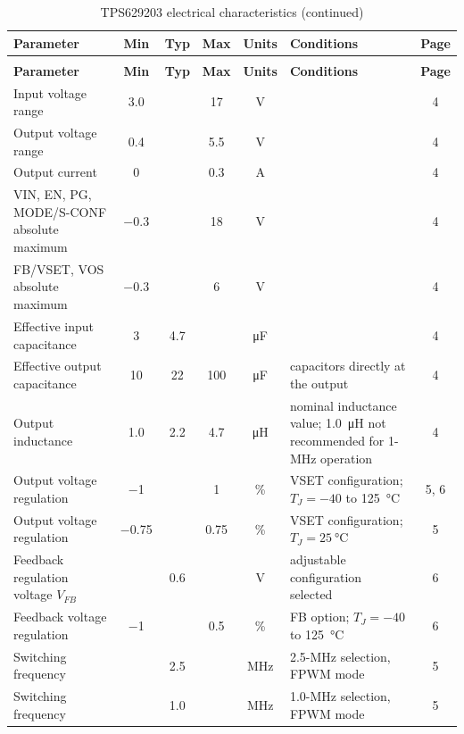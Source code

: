 {\footnotesize
\begin{longtable}{|L{4.4cm}|c|c|c|c|L{3.6cm}|c|}
\caption{TPS629203 electrical characteristics}\label{tab:tps629203}\\
\hline
\textbf{Parameter} & \textbf{Min} & \textbf{Typ} & \textbf{Max} & \textbf{Units} & \textbf{Conditions} & \textbf{Page} \\
\hline
\endfirsthead
\caption[]{TPS629203 electrical characteristics (continued)}\\
\hline
\textbf{Parameter} & \textbf{Min} & \textbf{Typ} & \textbf{Max} & \textbf{Units} & \textbf{Conditions} & \textbf{Page} \\
\hline
\endhead
Input voltage range & \num{3.0} & & \num{17} & \si{\volt} & & 4 \\
\hline
Output voltage range & \num{0.4} & & \num{5.5} & \si{\volt} & & 4 \\
\hline
Output current & \num{0} & & \num{0.3} & \si{\ampere} & & 4 \\
\hline
VIN, EN, PG, MODE/S-CONF absolute maximum & \num{-0.3} & & \num{18} & \si{\volt} & & 4 \\
\hline
FB/VSET, VOS absolute maximum & \num{-0.3} & & \num{6} & \si{\volt} & & 4 \\
\hline
Effective input capacitance & \num{3} & \num{4.7} & & \si{\micro\farad} & & 4 \\
\hline
Effective output capacitance & \num{10} & \num{22} & \num{100} & \si{\micro\farad} & capacitors directly at the output & 4 \\
\hline
Output inductance & \num{1.0} & \num{2.2} & \num{4.7} & \si{\micro\henry} & nominal inductance value; \SI{1.0}{\micro\henry} not recommended for 1-MHz operation & 4 \\
\hline
Output voltage regulation & \num{-1} & & \num{1} & \% & VSET configuration; \(T_J=-40\) to \SI{125}{\celsius} & 5, 6 \\
\hline
Output voltage regulation & \num{-0.75} & & \num{0.75} & \% & VSET configuration; \(T_J=\SI{25}{\celsius}\) & 5 \\
\hline
Feedback regulation voltage \(V_{FB}\) & & \num{0.6} & & \si{\volt} & adjustable configuration selected & 6 \\
\hline
Feedback voltage regulation & \num{-1} & & \num{0.5} & \% & FB option; \(T_J=-40\) to \SI{125}{\celsius} & 6 \\
\hline
Switching frequency & & \num{2.5} & & \si{\mega\hertz} & 2.5-MHz selection, FPWM mode & 5 \\
\hline
Switching frequency & & \num{1.0} & & \si{\mega\hertz} & 1.0-MHz selection, FPWM mode & 5 \\

\end{longtable}}
